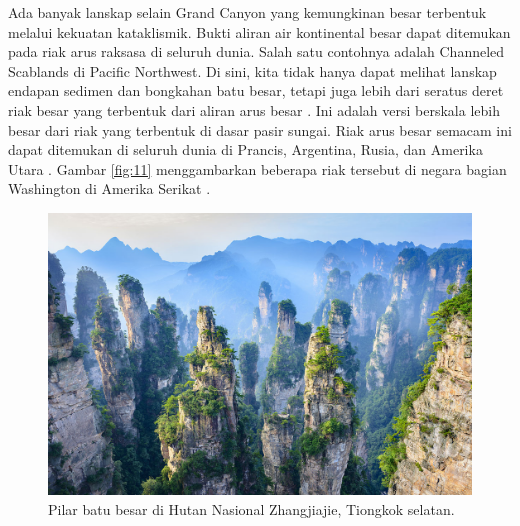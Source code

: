 \documentclass[10pt,twocolumn,letterpaper]{article}
\begin{document}
Ada banyak lanskap selain Grand Canyon yang kemungkinan besar terbentuk melalui kekuatan kataklismik. Bukti aliran air kontinental besar dapat ditemukan pada riak arus raksasa di seluruh dunia. Salah satu contohnya adalah Channeled Scablands di Pacific Northwest. Di sini, kita tidak hanya dapat melihat lanskap endapan sedimen dan bongkahan batu besar, tetapi juga lebih dari seratus deret riak besar yang terbentuk dari aliran arus besar \cite{78,79}. Ini adalah versi berskala lebih besar dari riak yang terbentuk di dasar pasir sungai. Riak arus besar semacam ini dapat ditemukan di seluruh dunia di Prancis, Argentina, Rusia, dan Amerika Utara \cite{81}. Gambar \ref{fig:11} menggambarkan beberapa riak tersebut di negara bagian Washington di Amerika Serikat \cite{80}.
\begin{figure}[b]
\begin{center}
   \includegraphics[width=1\linewidth]{zhangjiajie.jpg}
\end{center}
   \caption{Pilar batu besar di Hutan Nasional Zhangjiajie, Tiongkok selatan.}
\label{fig:12}
\label{fig:onecol}
\end{figure}
\end{document}
